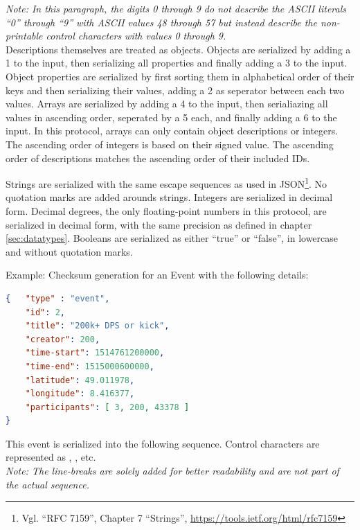 \documentclass[parskip=full,11pt]{scrartcl}
\begin{document}
\par \textit{Note: In this paragraph, the digits 0 through 9 do not describe
the ASCII literals \enquote{0} through \enquote{9} with ASCII values 48 through
57 but instead describe the non-printable control characters with values 0
through 9.}\\
Descriptions themselves are treated as objects.
Objects are serialized by adding a 1 to the input, then serializing all
properties and finally adding a 3 to the input.
Object properties are serialized by first sorting them in alphabetical order of
their keys and then serializing their values, adding a 2 as seperator between
each two values.
Arrays are serialized by adding a 4 to the input, then serialiazing all values
in ascending order, seperated by a 5 each, and finally adding a 6 to the input.
In this protocol, arrays can only contain object descriptions or integers.
The ascending order of integers is based on their signed value.
The ascending order of descriptions matches the ascending order of their
included IDs.

Strings are serialized with the same escape sequences as used in
JSON\footnote{Vgl. \enquote{RFC 7159}, Chapter 7 \enquote{Strings},
\url{https://tools.ietf.org/html/rfc7159}}.
No quotation marks are added arounds strings.
Integers are serialized in decimal form.
Decimal degrees, the only floating-point numbers in this protocol, are
serialized in decimal form, with the same precision as defined in chapter
\ref{sec:datatypes}.
Booleans are serialized as either \enquote{true} or \enquote{false}, in
lowercase and without quotation marks.

\par Example: Checksum generation for an Event with the following details:
\begin{lstlisting}[language=json,firstnumber=1]
{   "type" : "event",
    "id": 2,
    "title": "200k+ DPS or kick",
    "creator": 200,
    "time-start": 1514761200000,
    "time-end": 1515000600000,
    "latitude": 49.011978,
    "longitude": 8.416377,
    "participants": [ 3, 200, 43378 ]
}
\end{lstlisting}

\newcommand*\circled[1]{\tikz[baseline=(char.base)]{
            \node[shape=circle,draw,inner sep=1pt] (char) {\scriptsize #1};}}

This event is serialized into the following sequence.
Control characters are represented as \circled{1}, \circled{2}, \circled{3}
etc.\\
\textit{Note: The line-breaks are solely added for better readability and are
not part of the actual sequence.}
\end{document}

